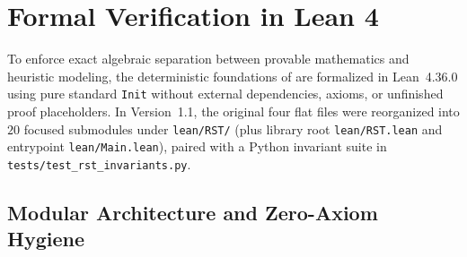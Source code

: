 \section{Formal Verification in Lean 4}
\label{sec:verification}

To enforce exact algebraic separation between provable mathematics and heuristic modeling,
the deterministic foundations of \RST{} are formalized in Lean~4.36.0 using pure standard
\texttt{Init} without external dependencies, axioms, or unfinished proof placeholders. In
Version~1.1, the original four flat files were reorganized into $20$ focused submodules under
\texttt{lean/RST/} (plus library root \texttt{lean/RST.lean} and entrypoint
\texttt{lean/Main.lean}), paired with a Python invariant suite in
\texttt{tests/test\_rst\_invariants.py}.

\subsection{Modular Architecture and Zero-Axiom Hygiene}
\label{subsec:ver-arch}

